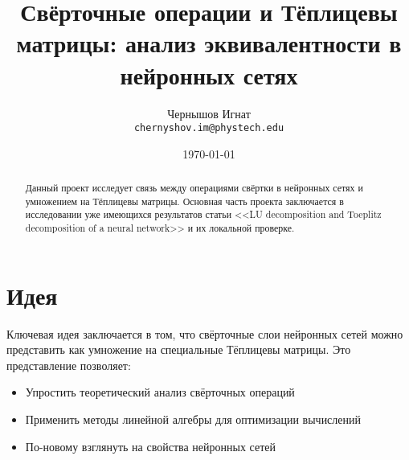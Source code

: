 \documentclass[]{scrartcl}
\title{Свёрточные операции и Тёплицевы матрицы: анализ эквивалентности в нейронных сетях}
\author{\begin{tabular}{c}
	  	 Чернышов Игнат \\
		 \texttt{chernyshov.im@phystech.edu}
		\end{tabular}}
\date{\today}
\begin{document}
\maketitle

\begin{abstract}

Данный проект исследует связь между операциями свёртки в нейронных сетях и умножением на Тёплицевы матрицы. Основная часть проекта заключается в исследовании уже имеющихся результатов статьи <<LU decomposition and Toeplitz decomposition of a neural network>> и их локальной проверке. 

\end{abstract}

\section{Идея}

Ключевая идея заключается в том, что свёрточные слои нейронных сетей можно представить как умножение на специальные Тёплицевы матрицы. Это представление позволяет:

\begin{itemize}
\item Упростить теоретический анализ свёрточных операций
\item Применить методы линейной алгебры для оптимизации вычислений
\item По-новому взглянуть на свойства нейронных сетей
\end{itemize}




\end{document}
